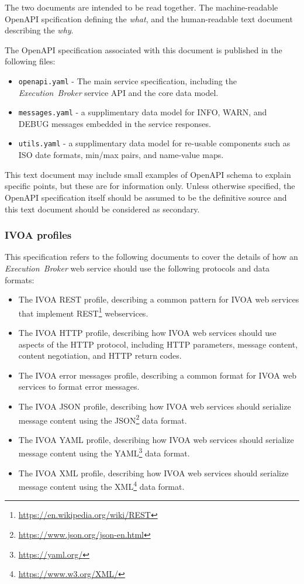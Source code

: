 \documentclass[11pt,a4paper]{ivoa}
\newcommand{\xml} {XML}
\newcommand{\json} {JSON}
\newcommand{\yaml} {YAML}
\newcommand{\http} {HTTP}
\newcommand{\rest} {REST}
\newcommand{\openapi} {OpenAPI}
\newcommand{\webservice} {web service}
\newcommand{\ivoa} {IVOA}
\newcommand{\executionbroker} {\textit{Execution~Broker}}
\newcommand{\codeword}[1] {\texttt{#1}}
\newcommand{\footurl}[1] {\footnote{\url{#1}}}
\begin{document}
The two documents are intended to be read together.
The machine-readable \openapi{} spcification defining the \textit{what},
and the human-readable text document describing the \textit{why}.

The \openapi{} specification associated with this document is
published in the following files:
\begin{itemize}
    \item \codeword{openapi.yaml} - The main service specification, including
    the \executionbroker{} service API and the core data model.
    \item \codeword{messages.yaml} - a supplimentary data model for INFO, WARN,
    and DEBUG messages embedded in the service responses.
    \item \codeword{utils.yaml} - a supplimentary data model for re-usable
    components such as ISO date formats, min/max pairs, and name-value maps.
\end{itemize}

This text document may include small examples of \openapi{} schema to
explain specific points, but these are for information only. Unless otherwise
specified, the \openapi{} specification itself should be assumed to be the
definitive source and this text document should be considered as secondary.

\subsubsection{IVOA profiles}
\label{ivoa-profiles}

This specification refers to the following documents
to cover the details of how an \executionbroker{} \webservice{}
should use the following protocols and data formats:
\begin{itemize}
    \item The \ivoa{} \rest{} profile, describing a common pattern
    for \ivoa{} \webservice{s} that implement
    \rest{}\footurl{https://en.wikipedia.org/wiki/REST}
    webservices.
    \item The \ivoa{} \http{} profile, describing how \ivoa{} \webservice{s}
    should use aspects of the \http{} protocol, including \http{} parameters,
    message content, content negotiation, and \http{} return codes.
    \item The \ivoa{} error messages profile, describing a common format
    for \ivoa{} \webservice{s} to format error messages.
    \item The \ivoa{} \json{} profile, describing how \ivoa{} \webservice{s}
    should serialize message content using the
    \json{}\footurl{https://www.json.org/json-en.html} data format.
    \item The \ivoa{} \yaml{} profile, describing how \ivoa{} \webservice{s}
    should serialize message content using the
    \yaml{}\footurl{https://yaml.org/} data format.
    \item The \ivoa{} \xml{} profile, describing how \ivoa{} \webservice{s}
    should serialize message content using the
    \xml{}\footurl{https://www.w3.org/XML/} data format.
\end{itemize}
\end{document}
